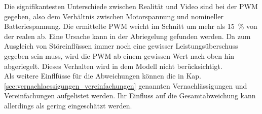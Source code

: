 Die signifikantesten Unterschiede zwischen Realität und Video sind bei der PWM gegeben, also dem Verhältnis zwischen Motorspannung und nomineller Batteriespannung. Die ermittelte PWM weicht im Schnitt um mehr als \SI{15}{\%} von der realen ab. Eine Ursache kann in der Abriegelung gefunden werden. Da zum Ausgleich von Störeinflüssen immer noch eine gewisser Leistungsüberschuss gegeben sein muss, wird die PWM ab einem gewissen Wert nach oben hin abgeriegelt. Dieses Verhalten wird in dem Modell nicht berücksichtigt. \\
Als weitere Einflfüsse für die Abweichungen können die in Kap. \ref{sec:vernachlaessigungen_vereinfachungen} genannten Vernachlässigungen und Vereinfachungen aufgelistet werden. Ihr Einfluss auf die Gesamtabweichung kann allerdings als gering eingeschätzt werden.
